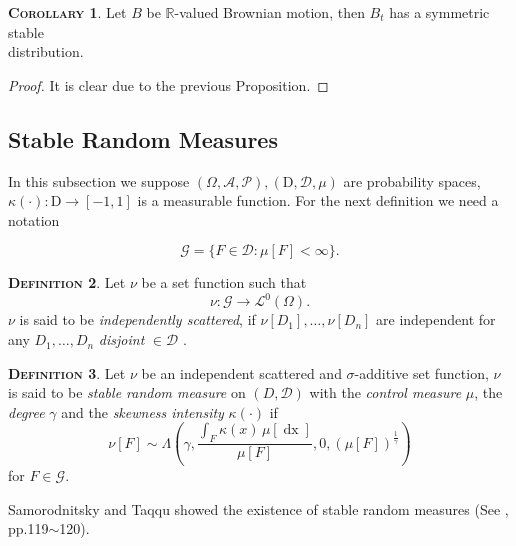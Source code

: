 \documentclass[a4paper, twoside, 11pt]{article}
\theoremstyle{definition}
\newtheorem{definition}{\scshape Definition}[section]
\newtheorem{corollary}[definition]{\scshape Corollary}
\newcommand{\brkt}[1]{\left({#1} \right)}
\begin{document}
  \begin{corollary}
	Let $B$ be $\mathbb{R}$-valued Brownian motion, then $B_t$ has a symmetric stable \\distribution.
  \end{corollary}
  \begin{proof}
	It is clear due to the previous Proposition.
  \end{proof}

  \subsection{Stable Random Measures}
  In this subsection we suppose $(\Omega, \mathscr{A}, \mathcal{P}), (\mathrm{D}, \mathscr{D}, \mu)$  are probability spaces, $\kappa(\cdot) : \mathrm{D} \rightarrow [-1, 1]$ is a measurable function. For the next definition we need a notation

  \begin{equation}
	\mathscr{G} = \{F \in \mathscr{D} : \mu[F] < \infty\}.
  \end{equation}

  \begin{definition}
	  Let $\nu$ be a set function such that
	  \begin{equation}
		\nu : \mathscr{G} \rightarrow \mathcal{L}^0(\Omega).\nonumber
	  \end{equation}
	  $\nu$ is said to be \emph{independently scattered}, if $\nu[D_1], \dots, \nu[D_n]$ are independent for any $D_1,\dots, D_n$ \emph{disjoint} $\in \mathscr{D}$ .
  \end{definition}


  \begin{definition}
	Let $\nu$ be an independent scattered and $\sigma$-additive set function,
	$\nu$ is said to be \emph{stable random measure} on $(D, \mathscr{D})$ with the \emph{control measure} $\mu$, the \emph{degree} $\gamma$ and the \emph{skewness intensity} $\kappa(\cdot)$ if 
  \begin{equation}
	\nu[F] \sim \Lambda\brkt{\gamma, \frac{\int_F \kappa(x)\, \mu[\mathop{dx}]}{\mu[F]}, 0, (\mu[F])^{\frac{1}{\gamma}}}
  \end{equation}
  for $F \in \mathscr{G}$.
  \end{definition}
  Samorodnitsky and Taqqu showed the existence of stable random measures (See \cite{samorodnitsky}, pp.119$\sim$120).
\end{document}
